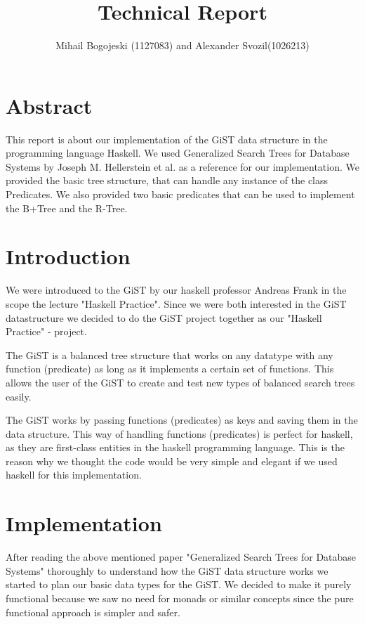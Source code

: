 \documentclass{scrartcl}
\title{Technical Report}
\author{Mihail Bogojeski (1127083) and Alexander Svozil(1026213)}
\date{}
\begin{document}
\maketitle
\tableofcontents
\newpage
 \section {Abstract}
    This report is about our implementation of the GiST data structure in the programming language Haskell.
    We used  Generalized Search Trees for Database Systems by Joseph M. Hellerstein et al. \cite{Hellerstein95generalizedsearch}
     as a reference for our implementation. We provided the basic tree structure, that can handle any 
    instance of the class Predicates. We also provided two basic predicates that can be used to implement the B+Tree and
    the R-Tree.
\newpage

 \section{Introduction}
 We were introduced to the GiST by our haskell professor Andreas Frank in the scope the lecture "Haskell Practice". 
 Since we were both interested in the GiST datastructure we decided to do the GiST project together as our "Haskell Practice" - project.
 
 The GiST is a balanced tree structure that works on any datatype with any function (predicate) as long as it implements
 a certain set of functions. This allows the user of the GiST to create and test new types of balanced search trees easily.

 The GiST works by passing functions (predicates) as keys and saving them in the data structure.
 This way of handling functions (predicates) is perfect for haskell, as they are first-class entities in the haskell programming language.
 This is the reason why we thought the code would be very simple and elegant if we used haskell for this implementation.

 \section{Implementation}

 After reading the above mentioned paper "Generalized Search Trees for Database Systems" \cite{Hellerstein95generalizedsearch} thoroughly to understand how the GiST data structure works we started to plan our basic
 data types for the GiST. We decided to make it purely functional because we saw no need for monads or similar concepts since the pure functional approach is simpler and safer.
 
\end{document}

